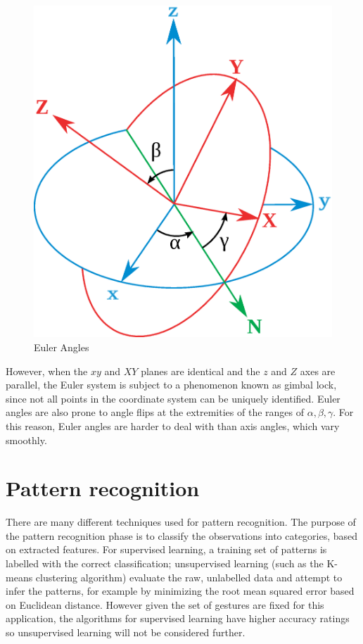 \documentclass[12pt,a4,notitlepage]{report}
\renewcommand{\_}{\texttt{\symbol{95}}}
\newcommand{\<}{\texttt{\symbol{60}}}
\renewcommand{\>}{\texttt{\symbol{62}}}
\begin{document}
\begin{figure}
\centering
\includegraphics[scale=0.2,angle=0]{diagrams/eulerangles.ps}
\caption{Euler Angles}
\label{eulerangles}
\end{figure}

However, when the $xy$ and $XY$ planes are identical and the $z$ and $Z$ axes are parallel, the Euler system is subject to a phenomenon known as gimbal lock, since not all points in the coordinate system can be uniquely identified. Euler angles are also prone to angle flips at the extremities of the ranges of $\alpha,\beta,\gamma$. For this reason, Euler angles are harder to deal with than axis angles, which vary smoothly.

\section{Pattern recognition}

There are many different techniques used for pattern recognition. The purpose of the pattern recognition phase is to classify the observations into categories, based on extracted features. For supervised learning, a training set of patterns is labelled with the correct classification; unsupervised learning (such as the K-means clustering algorithm) evaluate the raw, unlabelled data and attempt to infer the patterns, for example by minimizing the root mean squared error based on Euclidean distance. However given the set of gestures are fixed for this application, the algorithms for supervised learning have higher accuracy ratings so unsupervised learning will not be considered further.
\end{document}

